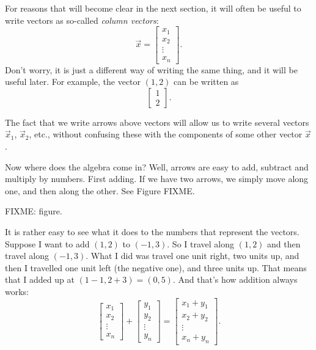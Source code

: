 For reasons that will become clear in the next section, it will often be
useful to write vectors as so-called
\emph{column vectors}:
\begin{equation*}
\vec{x} = 
\begin{bmatrix}
x_{1} \\ x_2 \\ \vdots \\ x_n
\end{bmatrix} .
\end{equation*}
Don't worry, it is just a different way of writing the same thing, and
it will be useful later.  For example, the vector $(1,2)$ can be written as
\begin{equation*}
\begin{bmatrix}
1 \\ 2
\end{bmatrix} .
\end{equation*}

The fact that we write arrows above vectors will allow us to write several
vectors $\vec{x}_1$, $\vec{x}_2$, etc., without confusing these with the
components of some other vector $\vec{x}$.


Now where does the algebra come in?  Well, arrows are easy to add, subtract
and multiply by numbers.  First adding.  If we have two arrows, we simply
move along one, and then along the other.  See Figure FIXME.

FIXME: figure.

It is rather easy to see what it does to the numbers that represent the
vectors.  Suppose I want to add $(1,2)$ to $(-1,3)$.  So I travel along $(1,2)$
and then travel along $(-1,3)$.
What I did was travel one unit right, two units up, and then
I travelled one unit left (the negative one), and three units up.  That
means that I added up at $(1-1,2+3) = (0,5)$.  And that's how addition
always works:
\begin{equation*}
\begin{bmatrix}
x_{1} \\ x_2 \\ \vdots \\ x_n
\end{bmatrix} +
\begin{bmatrix}
y_{1} \\ y_2 \\ \vdots \\ y_n
\end{bmatrix} =
\begin{bmatrix}
x_1 + y_{1} \\ x_2+ y_2 \\ \vdots \\ x_n + y_n
\end{bmatrix} .
\end{equation*}

